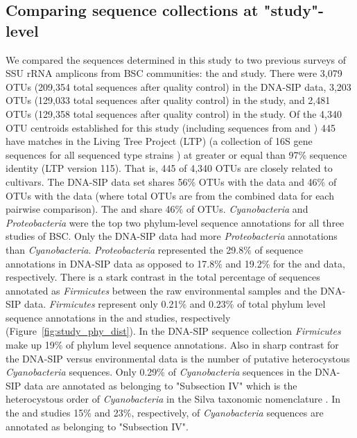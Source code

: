 \subsection{Comparing sequence collections at "study"-level}
We compared the sequences determined in this study to two previous surveys of
SSU rRNA amplicons from BSC communities: the \citet{Garcia_Pichel_2013}
and \citet{Steven_2013} study. There were 3,079 OTUs (209,354 total sequences
after quality control) in the DNA-SIP data, 3,203 OTUs (129,033 total sequences
after quality control) in the \citet{Garcia_Pichel_2013} study, and 2,481 OTUs
(129,358 total sequences after quality control) in the \citet{Steven_2013}
study. Of the 4,340 OTU centroids established for this study (including
sequences from \citet{Steven_2013} and \citet{Garcia_Pichel_2013}) 445 have
matches in the Living Tree Project (LTP) (a collection of 16S gene sequences
for all sequenced type strains \citep{Yarza_2008}) at greater or equal than
97\% sequence identity (LTP version 115). That is, 445 of 4,340 OTUs are
closely related to cultivars. The DNA-SIP data set shares 56\% OTUs with the
\citet{Steven_2013} data and 46\% of OTUs with the \citet{Garcia_Pichel_2013}
data (where total OTUs are from the combined data for each pairwise
comparison).  The \citet{Steven_2013} and \citet{Garcia_Pichel_2013} share 46\%
of OTUs. \textit{Cyanobacteria} and \textit{Proteobacteria} were the top two
phylum-level sequence annotations for all three studies of BSC. Only the
DNA-SIP data had more \textit{Proteobacteria} annotations than
\textit{Cyanobacteria}.  \textit{Proteobacteria} represented the 29.8\% of
sequence annotations in DNA-SIP data as opposed to 17.8\% and 19.2\% for the
\citet{Garcia_Pichel_2013} and \citet{Steven_2013} data, respectively.  There
is a stark contrast in the total percentage of sequences annotated as
\textit{Firmicutes} between the raw environmental samples and the DNA-SIP data.
\textit{Firmicutes} represent only 0.21\% and 0.23\% of total phylum level
sequence annotations in the \citet{Steven_2013} and \citet{Garcia_Pichel_2013}
studies, respectively (Figure~\ref{fig:study_phy_dist}). In the DNA-SIP
sequence collection \textit{Firmicutes} make up 19\% of phylum level sequence
annotations. Also in sharp contrast for the DNA-SIP versus environmental data
is the number of putative heterocystous \textit{Cyanobacteria} sequences. Only
0.29\% of \textit{Cyanobacteria} sequences in the DNA-SIP data are annotated as
belonging to "Subsection IV" which is the heterocystous order of
\textit{Cyanobacteria} in the Silva taxonomic nomenclature \citep{17947321}. In
the \citet{Steven_2013} and \citet{Garcia_Pichel_2013} studies 15\% and 23\%,
respectively, of \textit{Cyanobacteria} sequences are annotated as belonging to
"Subsection
IV".  

